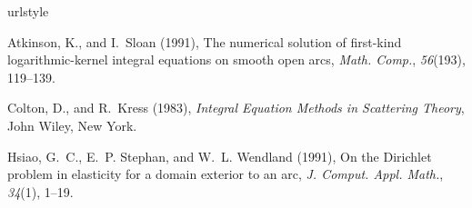 \documentclass[draft,wrr]{AGUTeX}
\begin{document}
\begin{article}










\begin{thebibliography}{}

\providecommand{\natexlab}[1]{#1}
\expandafter\ifx\csname urlstyle\endcsname\relax
  \providecommand{\doi}[1]{doi:\discretionary{}{}{}#1}\else
  \providecommand{\doi}{doi:\discretionary{}{}{}\begingroup
  \urlstyle{rm}\Url}\fi

Atkinson, K., and I.~Sloan (1991), The numerical solution of first-kind
  logarithmic-kernel integral equations on smooth open arcs, \textit{Math.
  Comp.}, \textit{56}(193), 119--139.

Colton, D., and R.~Kress (1983), \textit{Integral Equation Methods in
  Scattering Theory}, John Wiley, New York.

Hsiao, G.~C., E.~P. Stephan, and W.~L. Wendland (1991), On the {D}irichlet
  problem in elasticity for a domain exterior to an arc, \textit{J. Comput.
  Appl. Math.}, \textit{34}(1), 1--19.


\end{thebibliography}
\end{article}
\end{document}
